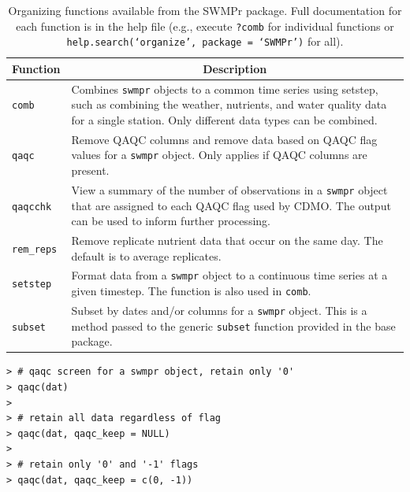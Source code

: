 \documentclass[10pt,letterpaper]{article}\usepackage[]{graphicx}\usepackage[]{color}
\makeatletter
\newenvironment{kframe}{%
 \def\at@end@of@kframe{}%
 \ifinner\ifhmode%
  \def\at@end@of@kframe{\end{minipage}}%
  \begin{minipage}{\columnwidth}%
 \fi\fi%
 \def\FrameCommand##1{\hskip\@totalleftmargin \hskip-\fboxsep
 \colorbox{shadecolor}{##1}\hskip-\fboxsep
     \hskip-\linewidth \hskip-\@totalleftmargin \hskip\columnwidth}%
 \MakeFramed {\advance\hsize-\width
   \@totalleftmargin\z@ \linewidth\hsize
   \@setminipage}}%
 {\par\unskip\endMakeFramed%
 \at@end@of@kframe}
\newenvironment{knitrout}{}{} %
\makeatother
\begin{document}
\begin{table}[!tbp]
\caption{Organizing functions available from the SWMPr package. Full documentation for each function is in the help file (e.g., execute \texttt{?comb} for individual functions or \texttt{help.search(`organize', package = `SWMPr')} for all).\label{tab:organize}} 
\begin{center}
\begin{tabular}{lp{3.5in}}
\hline\hline
\multicolumn{1}{l}{Function}&\multicolumn{1}{c}{Description}\tabularnewline
\hline
\texttt{comb}&Combines \texttt{swmpr} objects to a common time series using setstep, such as combining the weather, nutrients, and water quality data for a single station. Only different data types can be combined.\tabularnewline
\texttt{qaqc}&Remove \gls{QAQC} columns and remove data based on \gls{QAQC} flag values for a \texttt{swmpr} object.  Only applies if \gls{QAQC} columns are present. \tabularnewline
\texttt{qaqcchk}&View a summary of the number of observations in a \texttt{swmpr} object that are assigned to each \gls{QAQC} flag used by \gls{CDMO}.  The output can be used to inform further processing.\tabularnewline
\texttt{rem\_reps}&Remove replicate nutrient data that occur on the same day.  The default is to average replicates.\tabularnewline
\texttt{setstep}&Format data from a \texttt{swmpr} object to a continuous time series at a given timestep.  The function is also used in \texttt{comb}.\tabularnewline
\texttt{subset}&Subset by dates and/or columns for a \texttt{swmpr} object.  This is a method passed to the generic \texttt{subset} function provided in the base package.\tabularnewline
\hline
\end{tabular}\end{center}

\end{table}


\begin{knitrout}\small
{}\color{fgcolor}\begin{kframe}
\begin{verbatim}
> # qaqc screen for a swmpr object, retain only '0'
> qaqc(dat)
> 
> # retain all data regardless of flag
> qaqc(dat, qaqc_keep = NULL)
> 
> # retain only '0' and '-1' flags
> qaqc(dat, qaqc_keep = c(0, -1))
\end{verbatim}
\end{kframe}
\end{knitrout}
\end{document}
